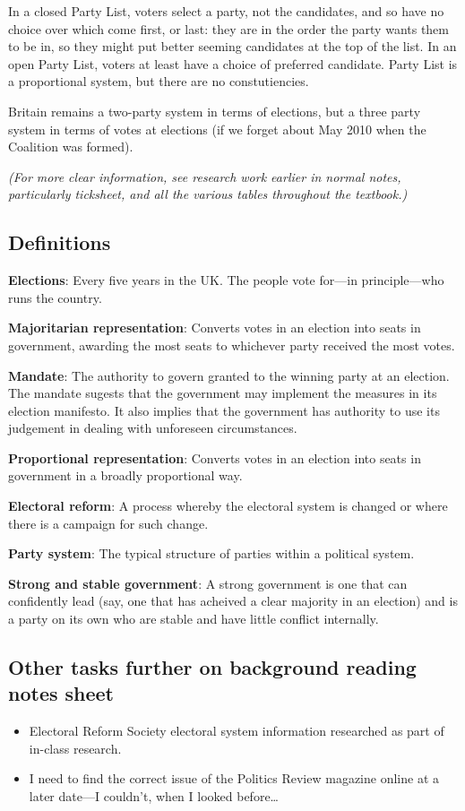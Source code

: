 \documentclass[12pt]{article}
\begin{document}
In a closed Party List, voters select a party, not the candidates, and so
have no choice over which come first, or last: they are in the order the
party wants them to be in, so they might put better seeming candidates at
the top of the list.  In an open Party List, voters at least have a choice
of preferred candidate.  Party List is a proportional system, but there are
no constutiencies.

Britain remains a two-party system in terms of elections, but a three party
system in terms of votes at elections (if we forget about May 2010 when the
Coalition was formed).

\textsl{(For more clear information, see research work earlier in normal notes,
particularly ticksheet, and all the various tables throughout the
textbook.)}
 
	\subsection*{Definitions}

	\textbf{Elections}: Every five years in the UK.  The people vote for---in principle---who runs the country. 

	\textbf{Majoritarian representation}: Converts votes in an election into seats in government, awarding the most seats to whichever party received the most votes. 

	\textbf{Mandate}: The authority to govern granted to the winning party at an election.  The mandate sugests that the government may implement the measures in its election manifesto.  It also implies that the government has authority to use its judgement in dealing with unforeseen circumstances.

	\textbf{Proportional representation}: Converts votes in an election into seats in government in a broadly proportional way.

	\textbf{Electoral reform}: A process whereby the electoral system is changed or where there is a campaign for such change.

	\textbf{Party system}: The typical structure of parties within a
political system.

	\textbf{Strong and stable government}: A strong government is one that can
confidently lead (say, one that has acheived a clear majority in an
election) and is a party on its own who are stable and have little conflict
internally.

	\subsection*{Other tasks further on background reading notes
sheet}

	\begin{itemize}
		\item{Electoral Reform Society electoral system information
researched as part of in-class research.}
 		\item{I need to find the correct issue of the Politics
Review magazine online at a later date---I couldn't, when I looked
before\ldots}
	\end{itemize}
\end{document}
